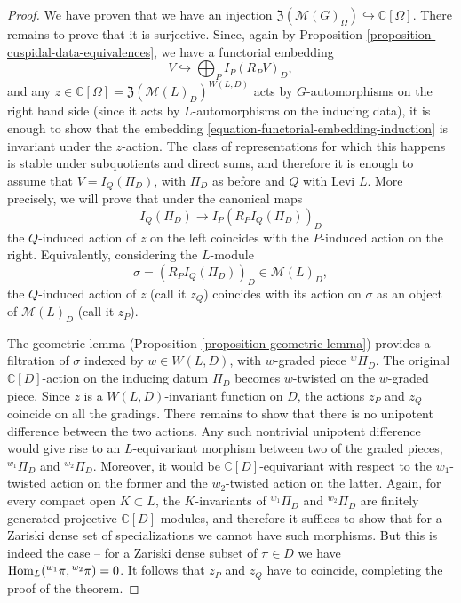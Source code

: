 \begin{proof}
We have proven that we have an injection $\mathfrak Z(\mathcal M(G)_\Omega)\hookrightarrow \mathbb C[\Omega]$. There remains to prove that it is surjective. Since, again by Proposition \ref{proposition-cuspidal-data-equivalences}, we have a functorial embedding
\begin{equation}
	\label{equation-functorial-embedding-induction} 
	V\hookrightarrow \bigoplus_P I_P (R_P V)_D,
\end{equation}
and any $z\in \mathbb C[\Omega] = \mathfrak Z(\mathcal M(L)_D)^{W(L,D)}$ acts by $G$-automorphisms on the right hand side (since it acts by $L$-automorphisms on the inducing data), it is enough to show that the embedding \eqref{equation-functorial-embedding-induction} is invariant under the $z$-action. The class of representations for which this happens is stable under subquotients and direct sums, and therefore it is enough to assume that $V=I_Q(\Pi_D)$, with $\Pi_D$ as before and $Q$ with Levi $L$. More precisely, we will prove that under the canonical maps 
$$ I_Q(\Pi_D) \to I_P (R_P I_Q(\Pi_D))_D$$
the $Q$-induced action of $z$ on the left coincides with the $P$-induced action on the right. Equivalently, considering the $L$-module 
$$ \sigma= (R_P I_Q(\Pi_D))_D \in \mathcal M(L)_D,$$
the $Q$-induced action of $z$ (call it $z_Q$) coincides with its action on $\sigma$ as an object of $\mathcal M(L)_D$ (call it $z_P$). 

The geometric lemma (Proposition \ref{proposition-geometric-lemma}) provides a filtration of $\sigma$ indexed by $w\in W(L,D)$, with $w$-graded piece ${^w\Pi_D}$. The original $\mathbb C[D]$-action on the inducing datum $\Pi_D$ becomes $w$-twisted on the $w$-graded piece. 
Since $z$ is a $W(L,D)$-invariant function on $D$, the actions $z_P$ and $z_Q$ coincide on all the gradings. There remains to show that there is no unipotent difference between the two actions. Any such nontrivial unipotent difference would give rise to an $L$-equivariant morphism between two of the graded pieces, ${^{w_1}\Pi_D}$ and ${^{w_2}\Pi_D}$. Moreover, it would be $\mathbb C[D]$-equivariant with respect to the $w_1$-twisted action on the former and the $w_2$-twisted action on the latter. Again, for every compact open $K\subset L$, the $K$-invariants of ${^{w_1}\Pi_D}$ and ${^{w_2}\Pi_D}$ are finitely generated projective $\mathbb C[D]$-modules, and therefore it suffices to show that for a Zariski dense set of specializations we cannot have such morphisms. But this is indeed the case -- for a Zariski dense subset of $\pi\in D$ we have  $\mathop{\rm Hom}\nolimits_L({^{w_1}\pi}, {^{w_2}\pi})=0$. It follows that $z_P$ and $z_Q$ have to coincide, completing the proof of the theorem.


\end{proof}

